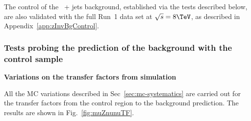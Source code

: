 The control of the \znunu\ + jets background, established via the
tests described below, are also validated with the full Run~1 data set
at $\sqrt{s} = 8\tev$, as described in
Appendix~\ref{app:zInvBgControl}.

\subsubsection{Tests probing the prediction of the \znunu
background with the \mj control sample}
\label{sec:muZnunu}

{\bf Variations on the transfer factors from simulation}

All the MC variations described in Sec~\ref{sec:mc-systematics} are
carried out for the transfer factors from the \mj control region to
the \znunu background prediction. The results are shown in
Fig.~\ref{fig:muZnunuTF}.

